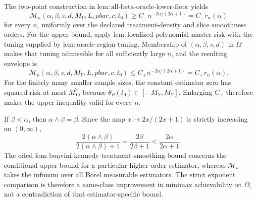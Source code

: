 The two-point construction in \(\mathrm{lem:all\text{-}beta\text{-}oracle\text{-}lower\text{-}floor}\) yields
\[
\mathcal M_n(\alpha,\beta,s,d,M_Y,L,pbar,c,t_0)
\ge C_-n^{-2\alpha/(2\alpha+1)}=C_-r_n(\alpha)
\]
for every \(n\), uniformly over the declared treatment-density and slice smoothness orders. For the upper bound, apply \(\mathrm{lem:localized\text{-}polynomial\text{-}master\text{-}risk}\) with the tuning supplied by \(\mathrm{lem:oracle\text{-}region\text{-}tuning}\). Membership of \((\alpha,\beta,s,d)\) in \(\Omega\) makes that tuning admissible for all sufficiently large \(n\), and the resulting envelope is
\[
\mathcal M_n(\alpha,\beta,s,d,M_Y,L,pbar,c,t_0)
\le C_+n^{-2\alpha/(2\alpha+1)}=C_+r_n(\alpha).
\]
For the finitely many smaller sample sizes, the constant estimator zero has squared risk at most \(M_Y^2\), because \(\theta_P(t_0)\in[-M_Y,M_Y]\). Enlarging \(C_+\) therefore makes the upper inequality valid for every \(n\).

If \(\beta<\alpha\), then \(\alpha\wedge\beta=\beta\). Since the map \(x\mapsto2x/(2x+1)\) is strictly increasing on \((0,\infty)\),
\[
\frac{2(\alpha\wedge\beta)}{2(\alpha\wedge\beta)+1}
=
\frac{2\beta}{2\beta+1}
<
\frac{2\alpha}{2\alpha+1}.
\]
The cited \(\mathrm{lem:bonvini\text{-}kennedy\text{-}treatment\text{-}smoothing\text{-}bound}\) concerns the conditional upper bound for a particular higher-order estimator, whereas \(\mathcal M_n\) takes the infimum over all Borel measurable estimators. The strict exponent comparison is therefore a same-class improvement in minimax achievability on \(\Omega\), not a contradiction of that estimator-specific bound.